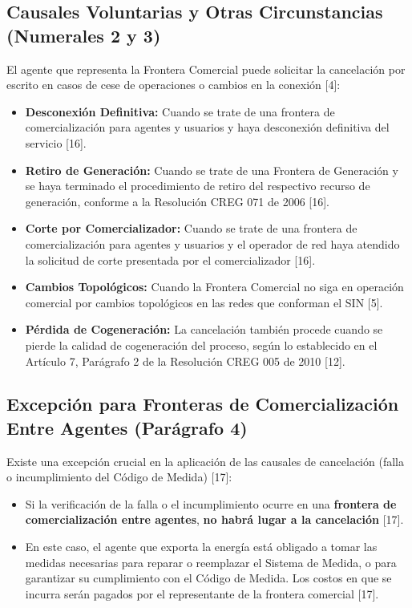 \documentclass[a5paper]{book}%
\begin{document}
\subsection{Causales Voluntarias y Otras Circunstancias (Numerales 2 y 3)}

El agente que representa la Frontera Comercial puede solicitar la cancelación por escrito en casos de cese de operaciones o cambios en la conexión [4]:

\begin{itemize}
	\item \textbf{Desconexión Definitiva:} Cuando se trate de una frontera de comercialización para agentes y usuarios y haya desconexión definitiva del servicio [16].
	\item \textbf{Retiro de Generación:} Cuando se trate de una Frontera de Generación y se haya terminado el procedimiento de retiro del respectivo recurso de generación, conforme a la Resolución CREG 071 de 2006 [16].
	\item \textbf{Corte por Comercializador:} Cuando se trate de una frontera de comercialización para agentes y usuarios y el operador de red haya atendido la solicitud de corte presentada por el comercializador [16].
	\item \textbf{Cambios Topológicos:} Cuando la Frontera Comercial no siga en operación comercial por cambios topológicos en las redes que conforman el SIN [5].
	\item \textbf{Pérdida de Cogeneración:} La cancelación también procede cuando se pierde la calidad de cogeneración del proceso, según lo establecido en el Artículo 7, Parágrafo 2 de la Resolución CREG 005 de 2010 [12].
\end{itemize}

\subsection{Excepción para Fronteras de Comercialización Entre Agentes (Parágrafo 4)}

Existe una excepción crucial en la aplicación de las causales de cancelación (falla o incumplimiento del Código de Medida) [17]:

\begin{itemize}
	\item Si la verificación de la falla o el incumplimiento ocurre en una \textbf{frontera de comercialización entre agentes}, \textbf{no habrá lugar a la cancelación} [17].
	\item En este caso, el agente que exporta la energía está obligado a tomar las medidas necesarias para reparar o reemplazar el Sistema de Medida, o para garantizar su cumplimiento con el Código de Medida. Los costos en que se incurra serán pagados por el representante de la frontera comercial [17].
\end{itemize}
\end{document}
